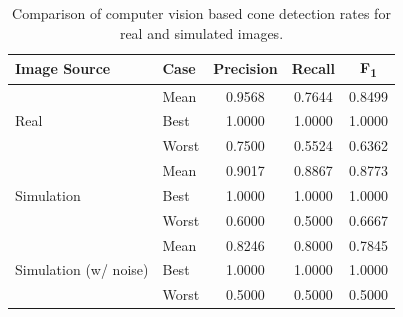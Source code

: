 \begin{table}[H] %
	\centering
	\caption[Vision based cone detection rates for real and simulated images]{Comparison of computer vision based cone detection rates for real and simulated images.}
	\label{tbl:8:visionConeDetectionRates}
	\begin{tabular}{llccc}
		\toprule
		Image Source                           & Case  & \multicolumn{1}{c}{Precision} & \multicolumn{1}{c}{Recall} & \multicolumn{1}{c}{F\textsubscript{1}} \\ \midrule
		\multirow{3}{*}{Real}                  & Mean  &            0.9568             &           0.7644           &                 0.8499                 \\
		                                       & Best  &            1.0000             &           1.0000           &                 1.0000                 \\
		                                       & Worst &            0.7500             &           0.5524           &                 0.6362                 \\ \midrule
		\multirow{3}{*}{Simulation}            & Mean  &            0.9017             &           0.8867           &                 0.8773                 \\
		                                       & Best  &            1.0000             &           1.0000           &                 1.0000                 \\
		                                       & Worst &            0.6000             &           0.5000           &                 0.6667                 \\ \midrule
		\multirow{3}{*}{Simulation (w/ noise)} & Mean  &            0.8246             &           0.8000           &                 0.7845                 \\
		                                       & Best  &            1.0000             &           1.0000           &                 1.0000                 \\
		                                       & Worst &            0.5000             &           0.5000           &                 0.5000                 \\ \bottomrule
	\end{tabular}
\end{table}

